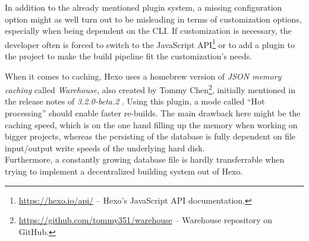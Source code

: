In addition to the already mentioned plugin system, a missing configuration option might as well turn out to be misleading in terms of customization options, especially when being dependent on the CLI. If customization is necessary, the developer often is forced to switch to the JavaScript API\footnote{\url{https://hexo.io/api/} -- Hexo's JavaScript API documentation.} or to add a plugin to the project to make the build pipeline fit the customization's needs.

When it comes to caching, Hexo uses a homebrew version of \emph{JSON memory caching} called \emph{Warehouse}, also created by Tommy Chen\footnote{\url{https://github.com/tommy351/warehouse} -- Warehouse repository on GitHub.}, initially mentioned in the release notes of \emph{3.2.0-beta.2} \cite{Chen2015hexorelease}. Using this plugin, a mode called ``Hot processing'' should enable faster re-builds. The main drawback here might be the caching speed, which is on the one hand filling up the memory when working on bigger projects, whereas the persisting of the database is fully dependent on file input/output write speeds of the underlying hard disk.\\
Furthermore, a constantly growing database file is hardly transferrable when trying to implement a decentralized building system out of Hexo.
